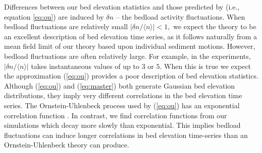 \documentclass[draft]{agujournal2018}
\newcommand\bra{\langle}
\newcommand\ket{\rangle}
\begin{document}
Differences between our bed elevation statistics and those predicted by \citet{Martin2014} (i.e., equation \ref{eq:ou}) are induced by $\delta n$ -- the bedload activity fluctuations.
When bedload fluctuations are relatively small $|\delta n/\bra n \ket|<1,$ we expect the \citet{Martin2014} theory to be an excellent description of bed elevation time series, as it follows naturally from a mean field limit of our theory based upon individual sediment motions.
However, bedload fluctuations are often relatively large.
For example, in the \citet{Ancey2008} experiments, $|\delta n/\bra n \ket|$ takes instantaneous values of up to $3$ or $5$.
When this is true we expect the approximation (\ref{eq:ou}) provides a poor description of bed elevation statistics.
Although (\ref{eq:ou}) and (\ref{eq:master}) both generate Gaussian bed elevation distributions, they imply very different correlations in the bed elevation time series.
The Ornstein-Uhlenbeck process used by \citet{Martin2014} (\ref{eq:ou}) has an exponential correlation function \citep[e.g.][]{Horsthemke1984,Risken1989}.
In contrast, we find correlation functions from our simulations which decay more slowly than exponential.
This implies bedload fluctuations can induce longer correlations in bed elevation time-series than an Ornstein-Uhlenbeck theory can produce.
\end{document}
